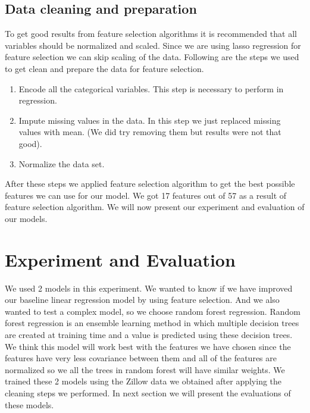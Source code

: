 \documentclass[a4paper, 11pt]{article}
\begin{document}
\subsection{Data cleaning and preparation}
To get good results from feature selection algorithms it is recommended that all variables should be normalized and scaled. Since we are using lasso regression for feature selection we can skip scaling of the data. Following are the steps we used to get clean and prepare the data for feature selection.
\begin{enumerate}
\item Encode all the categorical variables. This step is necessary to perform in regression.
\item Impute missing values in the data. In this step we just replaced missing values with mean. (We did try removing them but results were not that good).
\item Normalize the data set.

\end{enumerate}
After these steps we applied feature selection algorithm to get the best possible features we can use for our model. We got 17 features out of 57 as a result of feature selection algorithm. We will now present our experiment and evaluation of our models.
\section{Experiment and Evaluation}
We used 2 models in this experiment. We wanted to know if we have improved our baseline linear regression model by using feature selection. And we also wanted to test a complex model, so we choose random forest regression. Random forest regression is an ensemble learning method in which multiple decision trees are created at training time and a value is predicted using these decision trees. We think this model will work best with the features we have chosen since the features have very less covariance between them and all of the features are normalized so we all the trees in random forest will have similar weights. We trained these 2 models using the Zillow data we obtained after applying the cleaning steps we performed. In next section we will present the evaluations of these models.
\end{document}
